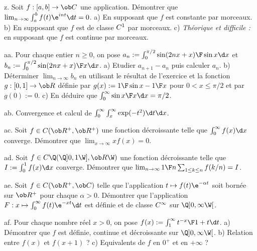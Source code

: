 \exo [Level=1,Fight=3,Learn=2,Field=\Intégration,Type=\Exercices,Origin=\MP] z. 
Soit $f:[a,b]\to\ob C$ une application. Démontrer que $\lim_{n\to\infty}\int_a^bf(t)\e^{int}\d t=0$. \pn
a) En supposant que $f$ est constante par morceaux. \pn
b) En supposant que $f$ est de classe $\sc C^1$ par morceaux. \pn
c) {\it Théorique et difficile : }en supposant que $f$ est continue par morceaux.  

\exo [Level=2,Fight=3,Learn=3,Field=\IntégralesGénéralisées,Type=\TravauxDirigés,Origin=] aa. 
Pour chaque entier $n\ge0$, on pose $a_n:=\int_0^{\pi/2}{\sin(2nx+x)\F\sin x }\d x$ et 
$b_n:=\int_0^{\pi/2}{\sin(2nx+x)\F x }\d x$. \pn
a) Etudier $a_{n+1}-a_n$ puis calculer $a_n$. \pn
b) Déterminer $\lim_{n\to\infty}b_n$ 
en utilisant le résultat de l'exercice  et la fonction $g:[0,1]\to\ob R$ 
définie par $g(x):={1\F\sin x}-{1\F x}$ pour $0<x\le \pi/2$ et par $g(0):=0$. \pn
c) En déduire que $\int_0^\infty{\sin x\F x}\d x={\pi/2}$. 

\exo [Level=2,Fight=1,Learn=1,Field=\IntégralesGénéralisées,Type=\Exercices,Origin=] ab. 
Convergence et calcul de $\int_0^\infty\int_x^\infty\exp(-t^2)\d t\d x$. 

\exo [Level=2,Fight=3,Learn=1,Field=\IntégralesGénéralisées,Type=\Colles,Origin=\MP] ac. 
Soit $f\in\sc C(\ob R^+,\ob R^+)$ une fonction décroissante telle que $\int_0^\infty f(x)\d x$ converge. \pn
Démontrer que $\lim_{x\to\infty}xf(x)=0$. 

\exo [Level=2,Fight=3,Learn=2,Field=\IntégralesGénéralisées,Type=\Colles,Origin=\MP] ad. 
Soit $f\in\sc C\Q(\Q]0,1\W],\ob R\W)$ une fonction décroissante 
telle que $I:=\int_0^1 f(x)\d x$ converge. \pn
Démontrer que $\lim_{n\to\infty}{1\F n}\sum_{1\le k\le n}f(k/n)=I$. 

\exo [Level=2,Fight=1,Learn=1,Field=\FonctionsDéfiniesParUneIntégrale,Type=\Cours,Origin=\MP] ae. 
Soit $f\in\sc C(\ob R^+,\ob C)$ telle que l'application $t\mapsto f(t)\e^{-\alpha t}$ 
soit bornée sur $\ob R^+$ pour chaque $\alpha>0$. \pn
Démontrer que l'application $F:x\mapsto\int_0^\infty f(t)\e^{-xt}\d t$ 
est définie et de classe $\sc C^\infty$ sur $\Q]0,\infty\W[$. 

\exo [Level=2,Fight=2,Learn=2,Field=\FonctionsDéfiniesParUneIntégrale,Type=\Exercices,Origin=\MP] af. 
Pour chaque nombre réel $x>0$, on pose $f(x):=\int_1^\infty{t^{-x}\F 1+t}\d t$. \pn
a) Démontrer que $f$ est définie, continue et décroissante sur $\Q]0,\infty\W[$. \pn
b) Relation entre $f(x)$ et $f(x+1)$ ? \pn
c) Equivalents de $f$ en $0^+$ et en $+\infty$ ?

